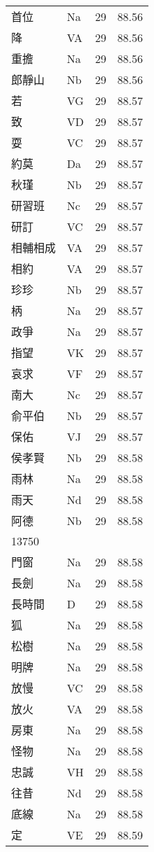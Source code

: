 \documentclass[twocolumn]{book}
\begin{document}
\begin{supertabular}{llrr}
首位 & Na & 29 &  88.56\\
降 & VA & 29 &  88.56\\
重擔 & Na & 29 &  88.56\\
郎靜山 & Nb & 29 &  88.56\\
若 & VG & 29 &  88.57\\
致 & VD & 29 &  88.57\\
耍 & VC & 29 &  88.57\\
約莫 & Da & 29 &  88.57\\
秋瑾 & Nb & 29 &  88.57\\
研習班 & Nc & 29 &  88.57\\
研訂 & VC & 29 &  88.57\\
相輔相成 & VA & 29 &  88.57\\
相約 & VA & 29 &  88.57\\
珍珍 & Nb & 29 &  88.57\\
柄 & Na & 29 &  88.57\\
政爭 & Na & 29 &  88.57\\
指望 & VK & 29 &  88.57\\
哀求 & VF & 29 &  88.57\\
南大 & Nc & 29 &  88.57\\
俞平伯 & Nb & 29 &  88.57\\
保佑 & VJ & 29 &  88.57\\
侯孝賢 & Nb & 29 &  88.58\\
雨林 & Na & 29 &  88.58\\
雨天 & Nd & 29 &  88.58\\
阿德 & Nb & 29 &  88.58\\
13750\\
門窗 & Na & 29 &  88.58\\
長劍 & Na & 29 &  88.58\\
長時間 & D & 29 &  88.58\\
狐 & Na & 29 &  88.58\\
松樹 & Na & 29 &  88.58\\
明牌 & Na & 29 &  88.58\\
放慢 & VC & 29 &  88.58\\
放火 & VA & 29 &  88.58\\
房東 & Na & 29 &  88.58\\
怪物 & Na & 29 &  88.58\\
忠誠 & VH & 29 &  88.58\\
往昔 & Nd & 29 &  88.58\\
底線 & Na & 29 &  88.58\\
定 & VE & 29 &  88.59\\

\end{supertabular}
\end{document}
